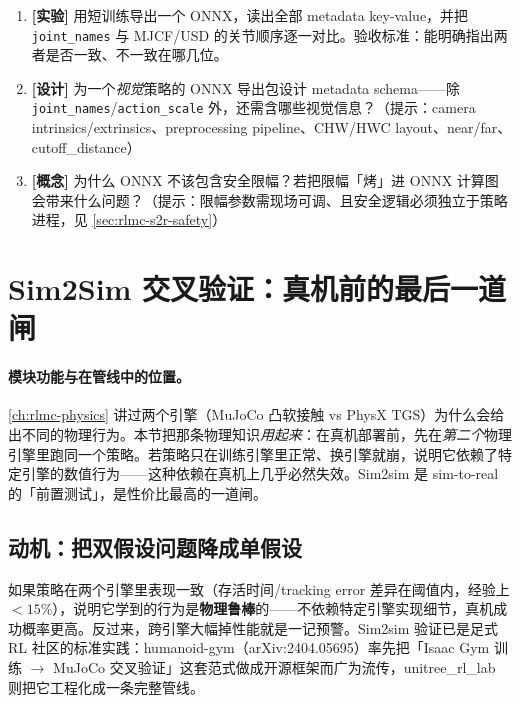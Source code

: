 \begin{practice}
\begin{enumerate}
  \item \textbf{[实验]} 用短训练导出一个 ONNX，读出全部 metadata key-value，并把 \verb|joint_names| 与 MJCF/USD 的关节顺序逐一对比。验收标准：能明确指出两者是否一致、不一致在哪几位。
  \item \textbf{[设计]} 为一个\emph{视觉}策略的 ONNX 导出包设计 metadata schema——除 \verb|joint_names|/\allowbreak\verb|action_scale| 外，还需含哪些视觉信息？（提示：camera intrinsics/extrinsics、preprocessing pipeline、CHW/HWC layout、near/far、cutoff\_distance）
  \item \textbf{[概念]} 为什么 ONNX 不该包含安全限幅？若把限幅「烤」进 ONNX 计算图会带来什么问题？（提示：限幅参数需现场可调、且安全逻辑必须独立于策略进程，见 \cref{sec:rlmc-s2r-safety}）
\end{enumerate}
\end{practice}

\section{Sim2Sim 交叉验证：真机前的最后一道闸}
\label{sec:rlmc-s2r-sim2sim}

\paragraph{模块功能与在管线中的位置。}\cref{ch:rlmc-physics} 讲过两个引擎（MuJoCo 凸软接触 vs PhysX TGS）为什么会给出不同的物理行为。本节把那条物理知识\emph{用起来}：在真机部署前，先在\emph{第二个}物理引擎里跑同一个策略。若策略只在训练引擎里正常、换引擎就崩，说明它依赖了特定引擎的数值行为——这种依赖在真机上几乎必然失效。Sim2sim 是 sim-to-real 的「前置测试」，是性价比最高的一道闸。

\subsection{动机：把双假设问题降成单假设}
\label{sec:rlmc-s2r-sim2sim-why}

如果策略在两个引擎里表现一致（存活时间/tracking error 差异在阈值内，经验上 $<15\%$），说明它学到的行为是\textbf{物理鲁棒}的——不依赖特定引擎实现细节，真机成功概率更高。反过来，跨引擎大幅掉性能就是一记预警。Sim2sim 验证已是足式 RL 社区的标准实践：humanoid-gym（arXiv:2404.05695）率先把「Isaac Gym 训练 $\to$ MuJoCo 交叉验证」这套范式做成开源框架而广为流传，unitree\_rl\_lab 则把它工程化成一条完整管线。

